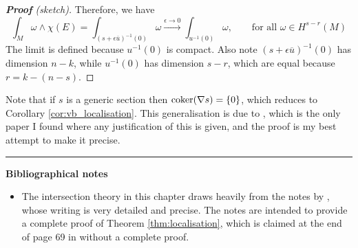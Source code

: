 \begin{proof}[\textbf{\textit{Proof}} (sketch)]
	Therefore, we have 
	\[
	\int_{M} \omega \wedge \chi(E) 
	= \int_{(s+\epsilon \overline{u})^{-1}(0)} \omega
	\xrightarrow{\epsilon \to 0} 
	\int_{u^{-1}(0)} \omega, \qquad
	\text{for all } \omega\in H^{s-r}(M)
	\]
	The limit is defined because $u^{-1}(0)$ is compact. 
	Also note $(s+\epsilon \overline{u})^{-1}(0)$ has dimension $n-k$, while 
	$u^{-1}(0)$ has dimension $s-r$, which are equal because
	$r = k-(n-s)$. 

\end{proof}

Note that if $s$ is a generic section then  $\operatorname{coker} (\nabla s) = \{0\}$, which
reduces to Corollary \ref{cor:vb_localisation}. This generalisation is due to
\citet[Sec 3.3]{witten_coker}, which is the only paper I found where any 
justification of this is given, and the proof is my best attempt to make it
precise.  
 

\vspace{5mm}
\hrule 
\vspace{5mm}

\textbf{Bibliographical notes}
{\small
\begin{itemize}
	\item The intersection theory in this chapter draws heavily from the notes by
	\citet{nicolaescu_intersection}, whose writing is very detailed and
	precise. The notes are intended to provide a complete proof of Theorem
	\ref{thm:localisation}, which is claimed at the end of page 69 in 
	\citet{bott_tu} without a complete proof.
\end{itemize}
}
